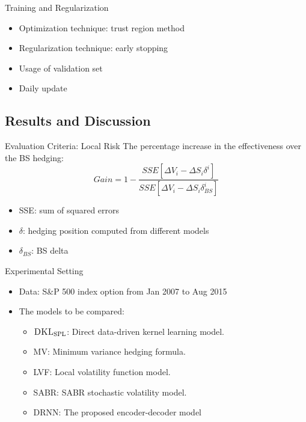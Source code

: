 \documentclass[10pt,table,mathserif]{beamer}
\newcommand{\DKLs}{\bf\textsc{DKL}_{\text{SPL}}}
\begin{document}
\begin{frame}[fragile]{Training and Regularization}
\begin{itemize}
  \item Optimization technique: trust region method
  \item Regularization technique: early stopping
  \item Usage of validation set
  \item Daily update
\end{itemize}
\end{frame}

\subsection{Results and Discussion}
\begin{frame}{Evaluation Criteria: Local Risk}
The percentage increase in the effectiveness over the BS hedging:
\[
Gain=1-\frac{SSE[\Delta V_i-\Delta S_i\delta^i]}{SSE[\Delta V_i-\Delta S_i\delta^i_{BS}]}
\]

\begin{itemize}
  \item SSE: sum of squared errors
  \item $\delta$: hedging position computed from different models
  \item $\delta_{BS}$: BS delta
\end{itemize}
\end{frame}

\begin{frame}{Experimental Setting}
\begin{itemize}
\item Data: S\&P 500 index option from Jan 2007 to Aug 2015
\item The models to be compared:
\begin{itemize}
	\item $\DKLs$: Direct data-driven kernel learning model.
	\item MV: Minimum variance hedging formula.
	\item LVF: Local volatility function model.
	\item SABR: SABR stochastic volatility model.
    \item DRNN: The proposed encoder-decoder model
\end{itemize}
\end{itemize}

\end{frame}
\end{document}
